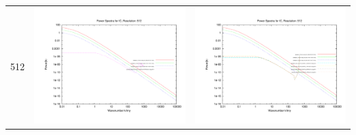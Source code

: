 \documentclass[a4paper,11pt,fleqn,oneside]{book}
\begin{document}
\begin{itemize}
\begin{table}
\begin{tabular}{l|c|c}
 512 & \includegraphics[scale=0.2]{analysis/powerspectra/IC_powspec_combined_512_h70.pdf} & \includegraphics[scale=0.2]{analysis/powerspectra/IC_powspec_combined_512_h100.pdf} \\

 \end{tabular}
\end{table}


\end{itemize}
\end{document}

